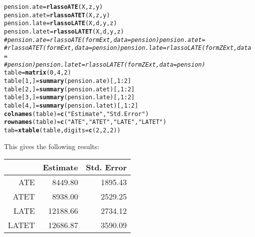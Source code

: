 \documentclass{amsart}\usepackage[]{graphicx}\usepackage[]{color}
\makeatletter
\newcommand{\hlnum}[1]{\textcolor[rgb]{0.686,0.059,0.569}{#1}}%
\newcommand{\hlstr}[1]{\textcolor[rgb]{0.192,0.494,0.8}{#1}}%
\newcommand{\hlcom}[1]{\textcolor[rgb]{0.678,0.584,0.686}{\textit{#1}}}%
\newcommand{\hlopt}[1]{\textcolor[rgb]{0,0,0}{#1}}%
\newcommand{\hlstd}[1]{\textcolor[rgb]{0.345,0.345,0.345}{#1}}%
\newcommand{\hlkwb}[1]{\textcolor[rgb]{0.69,0.353,0.396}{#1}}%
\newcommand{\hlkwc}[1]{\textcolor[rgb]{0.333,0.667,0.333}{#1}}%
\newcommand{\hlkwd}[1]{\textcolor[rgb]{0.737,0.353,0.396}{\textbf{#1}}}%
\newenvironment{kframe}{%
 \def\at@end@of@kframe{}%
 \ifinner\ifhmode%
  \def\at@end@of@kframe{\end{minipage}}%
  \begin{minipage}{\columnwidth}%
 \fi\fi%
 \def\FrameCommand##1{\hskip\@totalleftmargin \hskip-\fboxsep
 \colorbox{shadecolor}{##1}\hskip-\fboxsep
     \hskip-\linewidth \hskip-\@totalleftmargin \hskip\columnwidth}%
 \MakeFramed {\advance\hsize-\width
   \@totalleftmargin\z@ \linewidth\hsize
   \@setminipage}}%
 {\par\unskip\endMakeFramed%
 \at@end@of@kframe}
\newenvironment{knitrout}{}{} %
\makeatother
\begin{document}
\begin{knitrout}
\color{fgcolor}\begin{kframe}
\begin{alltt}
\hlstd{pension.ate} \hlkwb{=} \hlkwd{rlassoATE}\hlstd{(X, z, y)}
\hlstd{pension.atet} \hlkwb{=} \hlkwd{rlassoATET}\hlstd{(X, z, y)}
\hlstd{pension.late} \hlkwb{=} \hlkwd{rlassoLATE}\hlstd{(X, d, y, z)}
\hlstd{pension.latet} \hlkwb{=} \hlkwd{rlassoLATET}\hlstd{(X, d, y, z)}
\hlcom{# pension.ate = rlassoATE(formExt, data = pension) pension.atet =}
\hlcom{# rlassoATET(formExt, data = pension) pension.late = rlassoLATE(formZExt, data =}
\hlcom{# pension) pension.latet = rlassoLATET(formZExt, data = pension)}
\hlstd{table} \hlkwb{=} \hlkwd{matrix}\hlstd{(}\hlnum{0}\hlstd{,} \hlnum{4}\hlstd{,} \hlnum{2}\hlstd{)}
\hlstd{table[}\hlnum{1}\hlstd{, ]} \hlkwb{=} \hlkwd{summary}\hlstd{(pension.ate)[,} \hlnum{1}\hlopt{:}\hlnum{2}\hlstd{]}
\hlstd{table[}\hlnum{2}\hlstd{, ]} \hlkwb{=} \hlkwd{summary}\hlstd{(pension.atet)[,} \hlnum{1}\hlopt{:}\hlnum{2}\hlstd{]}
\hlstd{table[}\hlnum{3}\hlstd{, ]} \hlkwb{=} \hlkwd{summary}\hlstd{(pension.late)[,} \hlnum{1}\hlopt{:}\hlnum{2}\hlstd{]}
\hlstd{table[}\hlnum{4}\hlstd{, ]} \hlkwb{=} \hlkwd{summary}\hlstd{(pension.latet)[,} \hlnum{1}\hlopt{:}\hlnum{2}\hlstd{]}
\hlkwd{colnames}\hlstd{(table)} \hlkwb{=} \hlkwd{c}\hlstd{(}\hlstr{"Estimate"}\hlstd{,} \hlstr{"Std. Error"}\hlstd{)}
\hlkwd{rownames}\hlstd{(table)} \hlkwb{=} \hlkwd{c}\hlstd{(}\hlstr{"ATE"}\hlstd{,} \hlstr{"ATET "}\hlstd{,} \hlstr{"LATE"}\hlstd{,} \hlstr{"LATET"}\hlstd{)}
\hlstd{tab} \hlkwb{=} \hlkwd{xtable}\hlstd{(table,} \hlkwc{digits} \hlstd{=} \hlkwd{c}\hlstd{(}\hlnum{2}\hlstd{,} \hlnum{2}\hlstd{,} \hlnum{2}\hlstd{))}
\end{alltt}
\end{kframe}
\end{knitrout}

This gives the following results:

\begin{table}[ht]
\centering
\begin{tabular}{rrr}
  \hline
 & Estimate & Std. Error \\ 
  \hline
ATE & 8449.80 & 1895.43 \\ 
  ATET  & 8938.00 & 2529.25 \\ 
  LATE & 12188.66 & 2734.12 \\ 
  LATET & 12686.87 & 3590.09 \\ 
   \hline
\end{tabular}
\end{table}
\end{document}
